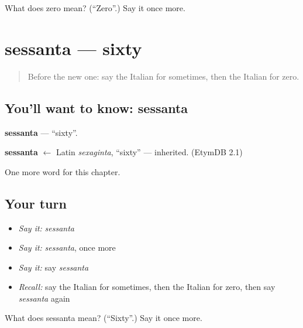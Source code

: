 \begin{tcolorbox}[breakable,colback=teal!4,colframe=teal!35!black,title={Before you move on}]
What does zero mean? (\textquotedblleft{}Zero\textquotedblright{}.) Say it once more.
\end{tcolorbox}
\section[sessanta]{sessanta — sixty}

\label{lesson:IT-C132-sessanta}



\begin{quote}
Before the new one: say the Italian for sometimes, then the Italian for zero.
\end{quote}

\subsection*{You'll want to know: sessanta}
\textbf{sessanta} — \textquotedblleft{}sixty\textquotedblright{}.

\begin{cousinweb}
\textbf{sessanta} $\leftarrow$ Latin \emph{sexaginta}, \textquotedblleft{}sixty\textquotedblright{} — inherited. (EtymDB 2.1)
\end{cousinweb}

\begin{grammarlens}[title={What you've built}]
One more word for this chapter.
\end{grammarlens}

\subsection*{Your turn}
\begin{itemize}
\raggedright
  \item \emph{Say it:} \emph{sessanta}
  \item \emph{Say it:} \emph{sessanta}, once more
  \item \emph{Say it:} say \emph{sessanta}
  \item \emph{Recall:} say the Italian for sometimes, then the Italian for zero, then say \emph{sessanta} again
\end{itemize}

\begin{tcolorbox}[breakable,colback=teal!4,colframe=teal!35!black,title={Before you move on}]
What does sessanta mean? (\textquotedblleft{}Sixty\textquotedblright{}.) Say it once more.
\end{tcolorbox}
